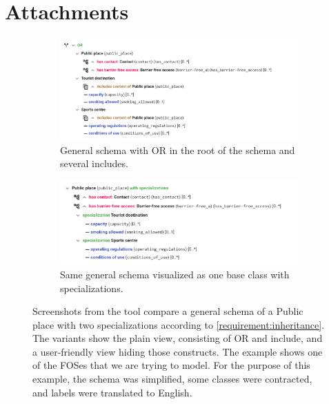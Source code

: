 \documentclass[12pt,a4paper,dvipsnames]{report}
\theoremstyle{definition}
\begin{document}
\chapter{Attachments}
\vfill
\begin{figure}[h!]
  \centering
  \begin{subfigure}[b]{\textwidth}
    \includegraphics[width=\textwidth]{img/or_inheritance_off.png}
    \caption{General schema with OR in the root of the schema and several includes.}
  \end{subfigure}
  \begin{subfigure}[b]{\textwidth}
    \includegraphics[width=\textwidth]{img/or_inheritance.png}
    \caption{Same general schema visualized as one base class with specializations.}
  \end{subfigure}
  \caption{Screenshots from the tool compare a general schema of a Public place with two specializations according to \autoref{requirement:inheritance}. The variants show the plain view, consisting of OR and include, and a user-friendly view hiding those constructs. The example shows one of the FOSes that we are trying to model. For the purpose of this example, the schema was simplified, some classes were contracted, and labels were translated to English.}
  \label{fig:screenshot-comparison}
\end{figure}
\vfill
\end{document}
